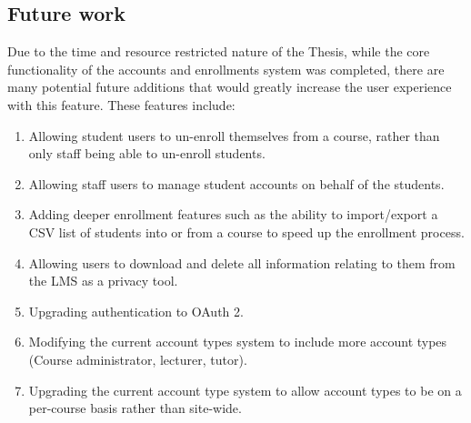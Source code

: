 \subsection{Future work}

Due to the time and resource restricted nature of the Thesis, while the core functionality of the accounts and enrollments system was completed, there are many potential future additions that would greatly increase the user experience with this feature. These features include:

\begin{enumerate}
    \item Allowing student users to un-enroll themselves from a course, rather than only staff being able to un-enroll students.
    \item Allowing staff users to manage student accounts on behalf of the students.
    \item Adding deeper enrollment features such as the ability to import/export a CSV list of students into or from a course to speed up the enrollment process.
    \item Allowing users to download and delete all information relating to them from the LMS as a privacy tool.
    \item Upgrading authentication to OAuth 2.
    \item Modifying the current account types system to include more account types (Course administrator, lecturer, tutor).
    \item Upgrading the current account type system to allow account types to be on a per-course basis rather than site-wide.
\end{enumerate} 
